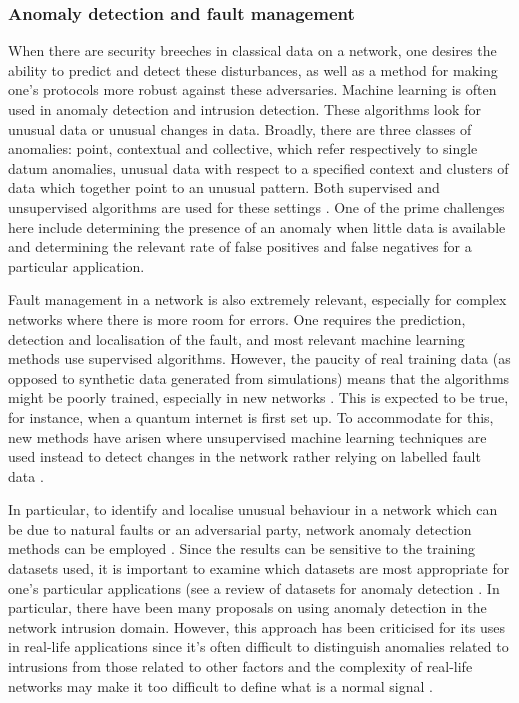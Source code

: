\documentclass[twocolumn, aps, rmp, amsmath, amssymb, nofootinbib, superscriptaddress, longbibliography, floatfix, table-of-contents, eqsecnum]{revtex4-2}
\begin{document}
\subsubsection{Anomaly detection and fault management}

When there are security breeches in classical data on a network, one desires the ability to predict and detect these disturbances, as well as a method for making one's protocols more robust against these adversaries. Machine learning is often used in anomaly detection and intrusion detection. These algorithms look for unusual data or unusual changes in data. Broadly, there are three classes of anomalies: point, contextual and collective, which refer respectively to single datum anomalies, unusual data with respect to a specified context and clusters of data which together point to an unusual pattern. Both supervised and unsupervised algorithms are used for these settings \cite{thottan2003anomaly, ahmed2007machine}. One of the prime challenges here include determining the presence of an anomaly when little data is available and determining the relevant rate of false positives and false negatives for a particular application.

Fault management in a network is also extremely relevant, especially for complex networks where there is more room for errors. One requires the prediction, detection and localisation of the fault, and most relevant machine learning methods use supervised algorithms. However, the paucity of real training data (as opposed to synthetic data generated from simulations) means that the algorithms might be poorly trained, especially in new networks \cite{hood1997proactive, kogeda2006prediction, snow2005assessing}. This is expected to be true, for instance, when a quantum internet is first set up. To accommodate for this, new methods have arisen where unsupervised machine learning techniques are used instead to detect changes in the network rather relying on labelled fault data \cite{hajji2005statistical}.

In particular, to identify and localise unusual behaviour in a network which can be due to natural faults or an adversarial party, network anomaly detection methods can be employed \cite{ahmed2007machine, fraley2017promise, joseph2013machine}. Since the results can be sensitive to the training datasets used, it is important to examine which datasets are most appropriate for one's particular applications (see a review of datasets for anomaly detection \cite{yavanoglu2017review}. In particular, there have been many proposals on using anomaly detection in the network intrusion domain. However, this approach has been criticised for its uses in real-life applications since it's often difficult to distinguish anomalies
related to intrusions from those related to other factors and the complexity of real-life networks may make it too difficult to define what is a normal signal \cite{sommer2010outside}.
\end{document}
